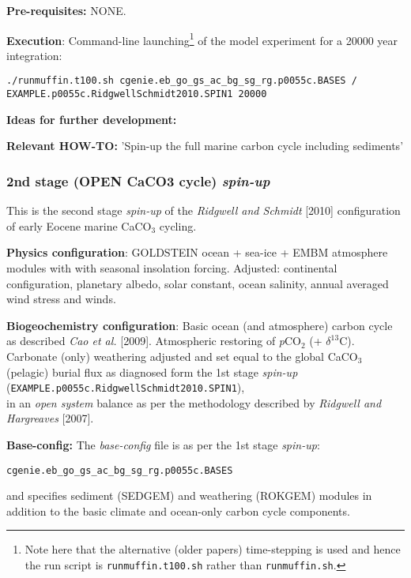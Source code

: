 \documentclass[10pt,twoside]{article}
\begin{document}
\noindent \textbf{Pre-requisites:} NONE.

\noindent \textbf{Execution}: Command-line launching\footnote{Note here that the alternative (older papers) time-stepping is used and hence the run script is \texttt{runmuffin.t100.sh} rather than \texttt{runmuffin.sh}.} of the model experiment for a 20000 year integration:
\vspace{-5pt}\begin{verbatim}./runmuffin.t100.sh cgenie.eb_go_gs_ac_bg_sg_rg.p0055c.BASES /
EXAMPLE.p0055c.RidgwellSchmidt2010.SPIN1 20000\end{verbatim}\vspace{-5pt}

\noindent \textbf{Ideas for further development:} 

\noindent \textbf{Relevant HOW-TO:} 'Spin-up the full marine carbon cycle including sediments'


\subsubsection{2nd stage (OPEN CaCO3 cycle) \textit{spin-up}}\label{EXAMPLE.p0055c.RidgwellSchmidt2010.SPIN2}

This is the second stage \textsl{spin-up} of the \textit{Ridgwell and Schmidt} [2010] configuration of early Eocene marine CaCO$_{3}$ cycling.

\noindent \textbf{Physics configuration}: GOLDSTEIN ocean + sea-ice + EMBM atmosphere modules with with seasonal insolation forcing. Adjusted: continental configuration, planetary albedo, solar constant, ocean salinity, annual averaged wind stress and winds.

\noindent \textbf{Biogeochemistry configuration}: Basic ocean (and atmosphere) carbon cycle as described \textit{Cao et al.} [2009]. Atmospheric restoring of \textit{p}CO$_{2}$ (+ $\delta^{13}$C). Carbonate (only) weathering adjusted and set equal to the global CaCO$_{3}$ (pelagic) burial flux as diagnosed form the 1st stage \textit{spin-up} 
\\ (\texttt{EXAMPLE.p0055c.RidgwellSchmidt2010.SPIN1}),
\\ in an \textit{open system} balance as per the methodology described by \textit{Ridgwell and Hargreaves} [2007].

\noindent \textbf{Base-config:} The \textit{base-config} file is as per the 1st stage \textit{spin-up}:
\vspace{-10pt}\begin{verbatim}cgenie.eb_go_gs_ac_bg_sg_rg.p0055c.BASES\end{verbatim}\vspace{-10pt}
and specifies sediment (SEDGEM) and weathering (ROKGEM) modules in addition to the basic climate and ocean-only carbon cycle components.
\end{document}
